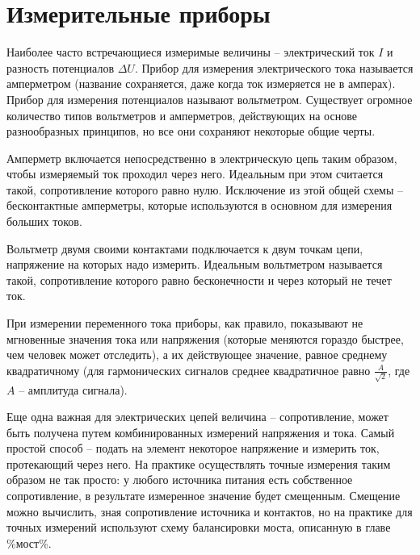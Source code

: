 \section{Измерительные приборы}

Наиболее часто встречающиеся измеримые величины -- электрический ток $I$ и разность потенциалов $\Delta U$. Прибор для измерения электрического тока называется амперметром (название сохраняется, даже когда ток измеряется не в амперах). Прибор для измерения потенциалов называют вольтметром. Существует огромное количество типов вольтметров и амперметров, действующих на основе разнообразных принципов, но все они сохраняют некоторые общие черты.

Амперметр включается непосредственно в электрическую цепь таким образом, чтобы измеряемый ток проходил через него. Идеальным при этом считается такой, сопротивление которого равно нулю. Исключение из этой общей схемы -- бесконтактные амперметры, которые используются в основном для измерения больших токов. 

Вольтметр двумя своими контактами подключается к двум точкам цепи, напряжение на которых надо измерить. Идеальным вольтметром называется такой, сопротивление которого равно бесконечности и через который не течет ток.

При измерении переменного тока приборы, как правило, показывают не мгновенные значения тока или напряжения (которые меняются гораздо быстрее, чем человек может отследить), а их действующее значение, равное среднему квадратичному (для гармонических сигналов среднее квадратичное равно $\frac{A}{\sqrt{2}}$, где $A$ -- амплитуда сигнала).

Еще одна важная для электрических цепей величина -- сопротивление, может быть получена путем комбинированных измерений напряжения и тока. Самый простой способ -- подать на элемент некоторое напряжение и измерить ток, протекающий через него. На практике осуществлять точные измерения таким образом не так просто: у любого источника питания есть собственное сопротивление, в результате измеренное значение будет смещенным. Смещение можно вычислить, зная сопротивление источника и контактов, но на практике для точных измерений используют схему балансировки моста, описанную в главе \%мост\%.

